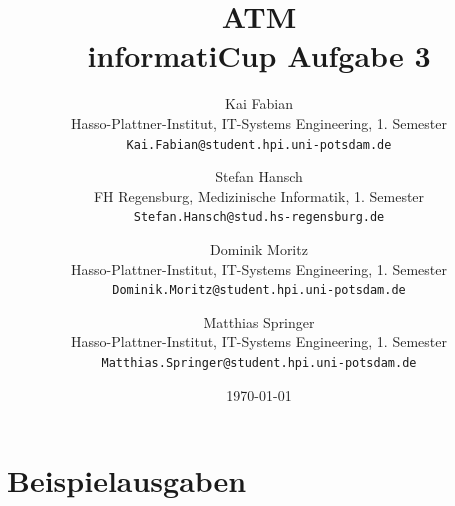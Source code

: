 \documentclass[12pt,a4paper]{article}
\begin{document}
\begin{titlepage}
\author{Kai Fabian\\Hasso-Plattner-Institut, IT-Systems Engineering, 1. Semester\\\texttt{Kai.Fabian@student.hpi.uni-potsdam.de} 
\and Stefan Hansch\\FH Regensburg, Medizinische Informatik, 1. Semester\\\texttt{Stefan.Hansch@stud.hs-regensburg.de} 
\and Dominik Moritz\\Hasso-Plattner-Institut, IT-Systems Engineering, 1. Semester\\\texttt{Dominik.Moritz@student.hpi.uni-potsdam.de}
\and Matthias Springer\\Hasso-Plattner-Institut, IT-Systems Engineering, 1. Semester\\\texttt{Matthias.Springer@student.hpi.uni-potsdam.de}}

\title{ATM\\informatiCup Aufgabe 3}

\date{\today}
\maketitle
\end{titlepage}
\pagestyle{fancy}
\tableofcontents









\section{Beispielausgaben}
\end{document}
